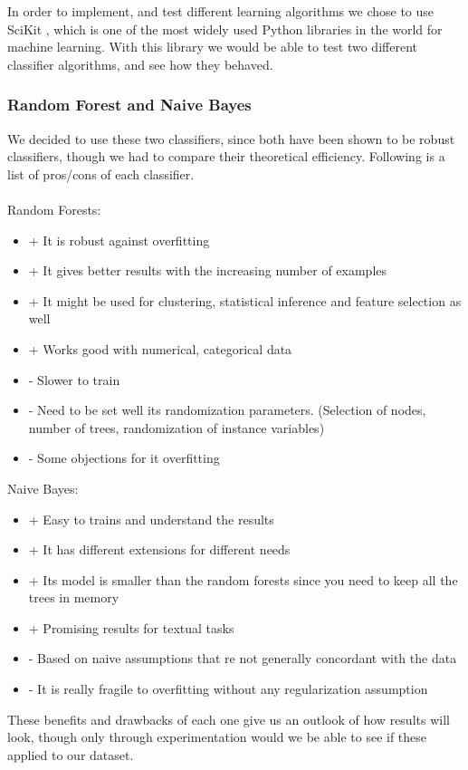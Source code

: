 In order to implement, and test different learning algorithms we chose to use SciKit \parencite{scikit}, which is one of the most widely used Python libraries in the world for machine learning. With this library we would be able to test two different classifier algorithms, and see how they behaved.

\subsubsection{Random Forest and Naive Bayes}

We decided to use these two classifiers, since both have been shown to be robust classifiers, though we had to compare their theoretical efficiency. Following is a list of pros/cons of each classifier.
\\\\
Random Forests:
\begin{itemize}
	\item + It is robust against overfitting
	\item + It gives better results with the increasing number of examples
	\item + It might be used for clustering, statistical inference and feature selection as well
	\item + Works good with numerical, categorical data
	\item - Slower to train
	\item - Need to be set well its randomization parameters. (Selection of nodes, number of trees, randomization of instance variables)
	\item - Some objections for it overfitting
\end{itemize}
Naive Bayes:
\begin{itemize}
	\item + Easy to trains and understand the results
	\item + It has different extensions for different needs
	\item + Its model is smaller than the random forests since you need to keep all the trees in memory
	\item + Promising results for textual tasks
	\item - Based on naive assumptions that re not generally concordant with the data
	\item - It is really fragile to overfitting without any regularization assumption
\end{itemize}

These benefits and drawbacks of each one give us an outlook of how results will look, though only through experimentation would we be able to see if these applied to our dataset.

